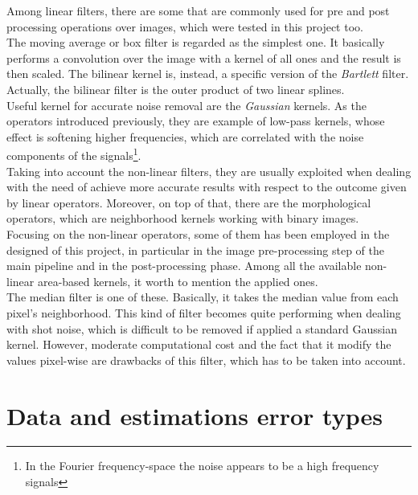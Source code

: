 Among linear filters, there are some that are commonly used for pre and post processing operations over images, which were tested in this project too.\\
The moving average or box filter is regarded as the simplest one. 
It basically performs a convolution over the image with a kernel of all ones and the result is then scaled. 
The bilinear kernel is, instead, a specific version of the \textit{Bartlett} filter. 
Actually, the bilinear filter is the outer product of two linear splines.\\
Useful kernel for accurate noise removal are the \textit{Gaussian} kernels.
As the operators introduced previously, they are example of low-pass kernels, whose effect is softening higher frequencies, which are correlated with the noise components of the signals\footnote{In the Fourier frequency-space the noise appears to be a high frequency signals}. \\
Taking into account the non-linear filters, they are usually exploited when dealing with the need of achieve more accurate results with respect to the outcome given by linear operators.
Moreover, on top of that, there are the morphological operators, which are neighborhood kernels working with binary images.\\
Focusing on the non-linear operators, some of them has been employed in the designed of this project, in particular in the image pre-processing step of the main pipeline and in the post-processing phase.
Among all the available non-linear area-based kernels, it worth to mention the applied ones.\\
The median filter is one of these. 
Basically, it takes the median value from each pixel's neighborhood.
This kind of filter becomes quite performing when dealing with shot noise, which is difficult to be removed if applied a standard Gaussian kernel.
However, moderate computational cost and the fact that it modify the values pixel-wise are drawbacks of this filter, which has to be taken into account.


\section{Data and estimations error types}
\label{section:error-types}













